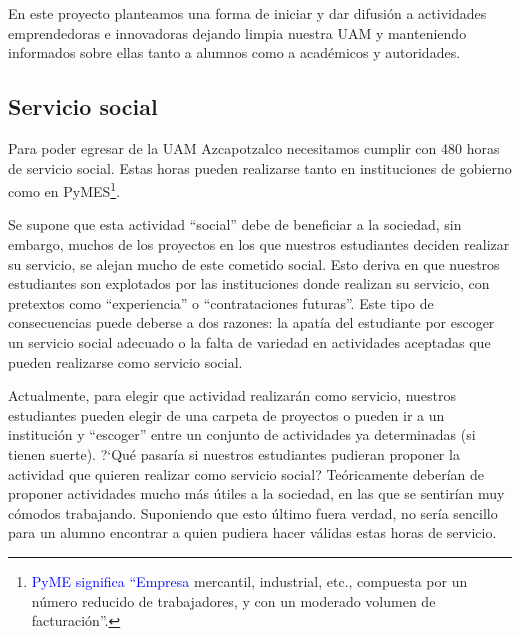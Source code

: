 \documentclass[11pt,letterpaper,titlepage]{article}
\begin{document}
En este proyecto planteamos una forma de iniciar y dar difusi\'on a actividades emprendedoras e innovadoras dejando limpia nuestra UAM y manteniendo informados sobre ellas tanto a alumnos como a acad\'emicos y autoridades.

\subsection{Servicio social}

Para poder egresar de la UAM Azcapotzalco necesitamos cumplir con 480 horas de servicio social. Estas horas pueden realizarse tanto en instituciones de gobierno como en PyMES\footnote{\textcolor{blue}{PyME significa ``Empresa} mercantil, industrial, etc., compuesta por un n\'umero reducido de trabajadores, y con un moderado volumen de facturaci\'on''.}\textcolor{blue}{\cite{rae}}.

Se supone que esta actividad ``social'' debe de beneficiar a la sociedad, sin embargo, muchos de los proyectos en los que nuestros estudiantes deciden realizar su servicio, se alejan mucho de este cometido social. Esto deriva en que nuestros estudiantes son explotados por las instituciones donde realizan su servicio, con pretextos como ``experiencia'' o ``contrataciones futuras''. Este tipo de consecuencias puede deberse a dos razones: la apat\'ia del estudiante por escoger un servicio social adecuado o la falta de variedad en actividades aceptadas que pueden realizarse como servicio social.

Actualmente, para elegir que actividad realizar\'an como servicio, nuestros estudiantes pueden elegir de una carpeta de proyectos o pueden ir a un instituci\'on y ``escoger'' entre un conjunto de actividades ya determinadas  (si tienen suerte).  ?`Qu\'e pasar\'ia si nuestros estudiantes pudieran proponer la actividad que quieren realizar como servicio social? Te\'oricamente deber\'ian de proponer actividades mucho m\'as \'utiles a la sociedad, en las que se sentir\'ian muy c\'omodos trabajando. Suponiendo que esto \'ultimo fuera verdad, no ser\'ia sencillo para un alumno encontrar a quien pudiera hacer v\'alidas estas horas de servicio.
\end{document}
